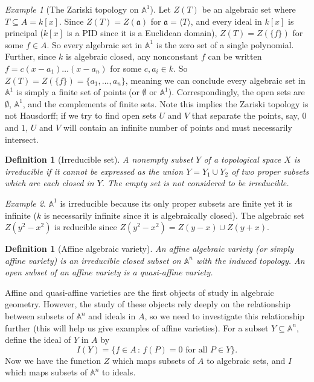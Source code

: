 \documentclass[12pt]{amsart}
\newcommand{\An}{\mathbb{A}^n}
\newtheorem{definition}[theorem]{Definition}
\theoremstyle{remark}
\theoremstyle{remark}
\newtheorem*{example}{Example}
\theoremstyle{remark}
\begin{document}
\begin{example}[The Zariski topology on $\mathbb{A}^1$]
Let $Z(T)$ be an algebraic set where $T \subseteq A = k[x]$.
Since $Z(T) = Z(\mathfrak{a})$ for $\mathfrak{a} = \langle T \rangle$, and every ideal in $k[x]$ is principal ($k[x]$ is a PID since it is a Euclidean domain), $Z(T) = Z(\{f\})$ for some $f \in A$.
So every algebraic set in $\mathbb{A}^1$ is the zero set of a single polynomial.
Further, since $k$ is algebraic closed, any nonconstant $f$ can be written $f = c(x - a_1) \dots (x-a_n)$ for some $c, a_i \in k$.
So $Z(T) = Z(\{f\}) = \{a_1, \ldots, a_n\}$, meaning we can conclude every algebraic set in $\mathbb{A}^1$ is simply a finite set of points (or $\emptyset$ or $\mathbb{A}^1$).
Correspondingly, the open sets are $\emptyset$, $\mathbb{A}^1$, and the complements of finite sets.
Note this implies the Zariski topology is not Hausdorff;
if we try to find open sets $U$ and $V$ that separate the points, say, $0$ and $1$, $U$ and $V$ will contain an infinite number of points and must necessarily intersect.
\end{example}

\begin{definition}[Irreducible set]
A nonempty subset $Y$ of a topological space $X$ is irreducible if it cannot be expressed as the union $Y = Y_1 \cup Y_2$ of two proper subsets which are each closed in $Y$.
The empty set is not considered to be irreducible.
\end{definition}

\begin{example}
$\mathbb{A}^1$ is irreducible because its only proper subsets are finite yet it is infinite ($k$ is necessarily infinite since it is algebraically closed).
The algebraic set $Z(y^2 - x^2)$ is reducible since $Z(y^2 - x^2) = Z(y - x) \cup Z(y +x)$.
\end{example}

\begin{definition}[Affine algebraic variety]
An affine algebraic variety (or simply affine variety) is an irreducible closed subset on $\An$ with the induced topology.
An open subset of an affine variety is a quasi-affine variety.
\end{definition}

Affine and quasi-affine varieties are the first objects of study in algebraic geometry.
However, the study of these objects rely deeply on the relationship between subsets of $\An$ and ideals in $A$, so we need to investigate this relationship further (this will help us give examples of affine varieties).
For a subset $Y \subseteq \An$, define the ideal of $Y$ in $A$ by
$$I(Y) = \{f \in A \, : \, f(P) = 0 \text{ for all } P \in Y\}.$$
Now we have the function $Z$ which maps subsets of $A$ to algebraic sets, and $I$ which maps subsets of $\An$ to ideals.
\end{document}

